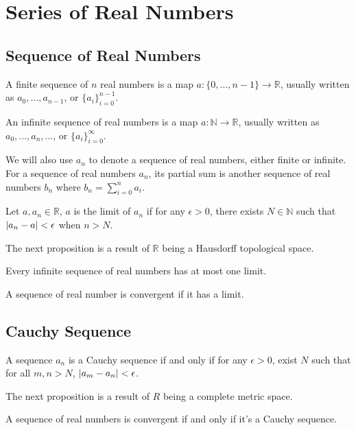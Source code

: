 \section{Series of Real Numbers}
\subsection{Sequence of Real Numbers}
A finite sequence of $n$ real numbers is a map $a : \{0, \dots, n - 1\} \to \mathbb R$, usually written as $a_0, \dots, a_{n - 1}$, or $\{a_i\}_{i=0}^{n-1}$.

An infinite sequence of real numbers is a map $a : \mathbb N \to \mathbb R$,
usually written as $a_0, \dots, a_n, \dots$, or $\{a_i\}_{i=0}^\infty$.

We will also use $a_n$ to denote a sequence of real numbers, either finite or
infinite. For a sequence of real numbers $a_n$, its partial sum is another
sequence of real numbers $b_n$ where $b_n = \sum_{i=0}^n a_i$.

\begin{defi}
Let $a, a_n \in \mathbb R$, $a$ is the limit of $a_n$ if for any $\epsilon > 0$, there exists $N \in \mathbb N$ such that $\left| {a_n - a} \right| < \epsilon$ when $n > N$.
\end{defi}

The next proposition is a result of $\mathbb R$ being a Hausdorff topological space.
\begin{pro}
Every infinite sequence of real numbers has at most one limit.
\end{pro}

\begin{defi}[convergence]
A sequence of real number is convergent if it has a limit.
\end{defi}

\subsection{Cauchy Sequence}

\begin{defi}
A sequence $a_n$ is a Cauchy sequence if and only if for any $\epsilon > 0$,
exist $N$ such that for all $m, n > N$, $\left| {a_m - a_n} \right| < \epsilon$.
\end{defi}

The next proposition is a result of $R$ being a complete metric space.
\begin{pro}
A sequence of real numbers is convergent if and only if it's a Cauchy sequence.
\end{pro}

